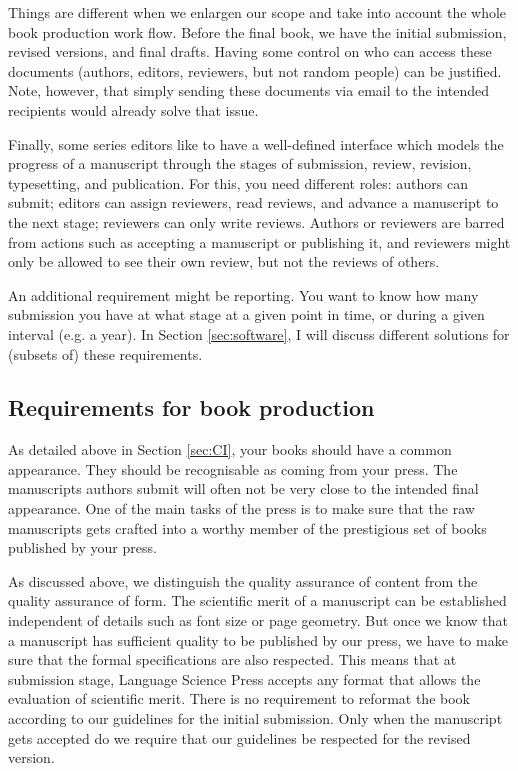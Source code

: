 \documentclass[output=guidelines,guidelines] {langscibook}
\begin{document}
Things are different when we enlargen our scope and take into account the whole book production work flow. Before the final book, we have the initial submission, revised versions, and final drafts. Having some control on who can access these documents (authors, editors, reviewers, but not random people) can be justified. Note, however, that simply sending these documents via email to the intended recipients would already solve that issue.

Finally, some series editors like to have a well-defined interface which models the progress of a manuscript through the stages of submission, review, revision, typesetting, and publication. For this, you need different roles: authors can submit; editors can assign reviewers, read reviews, and advance a manuscript to the next stage; reviewers can only write reviews. Authors or reviewers are barred from actions such as accepting a manuscript or publishing it, and reviewers might only be allowed to see their own review, but not the reviews of others. 

An additional requirement might be reporting. You want to know how many submission you have at what stage at a given point in time, or during a given interval (e.g. a year). In Section \ref{sec:software}, I will discuss different solutions for (subsets of) these requirements. 
 
 
\subsection{Requirements for book production}
As detailed above in Section \ref{sec:CI}, your books should have a common appearance. They should be recognisable as coming from your press. The manuscripts authors submit will often not be very close to the intended final appearance. One of the main tasks of the press is to make sure that the raw manuscripts gets crafted into a worthy member of the prestigious set of books published by your press. 

As discussed above, we distinguish the quality assurance of content from the quality assurance of form. The scientific merit of a manuscript can be established independent of details such as font size or page geometry. But once we know that a manuscript has sufficient quality to be published by our press, we have to make sure that the formal specifications are also respected. This means that at submission stage, Language Science Press accepts any format that allows the evaluation of scientific merit. There is no requirement to reformat the book according to our guidelines for the initial submission. Only when the manuscript gets accepted do we require that our guidelines be respected for the revised version. 
\end{document}
